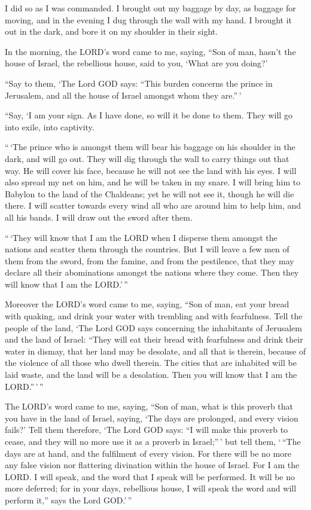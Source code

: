  I did so as I was commanded. I brought out my baggage by
day, as baggage for moving, and in the evening I dug through the wall
with my hand. I brought it out in the dark, and bore it on my shoulder
in their sight.

 In the morning, the LORD's word came to me, saying,
 ``Son of man, hasn't the house of Israel, the rebellious
house, said to you, `What are you doing?'

 ``Say to them, `The Lord GOD says: ``This burden concerns
the prince in Jerusalem, and all the house of Israel amongst whom they
are.''\,'

 ``Say, `I am your sign. As I have done, so will it be done
to them. They will go into exile, into captivity.

 ``\,`The prince who is amongst them will bear his baggage
on his shoulder in the dark, and will go out. They will dig through the
wall to carry things out that way. He will cover his face, because he
will not see the land with his eyes.  I will also spread my
net on him, and he will be taken in my snare. I will bring him to
Babylon to the land of the Chaldeans; yet he will not see it, though he
will die there.  I will scatter towards every wind all who
are around him to help him, and all his bands. I will draw out the sword
after them.

 ``\,`They will know that I am the LORD when I disperse
them amongst the nations and scatter them through the countries.
 But I will leave a few men of them from the sword, from
the famine, and from the pestilence, that they may declare all their
abominations amongst the nations where they come. Then they will know
that I am the LORD.'\,''

 Moreover the LORD's word came to me, saying, 
``Son of man, eat your bread with quaking, and drink your water with
trembling and with fearfulness.  Tell the people of the
land, `The Lord GOD says concerning the inhabitants of Jerusalem and the
land of Israel: ``They will eat their bread with fearfulness and drink
their water in dismay, that her land may be desolate, and all that is
therein, because of the violence of all those who dwell therein.
 The cities that are inhabited will be laid waste, and the
land will be a desolation. Then you will know that I am the
LORD.''\,'\,''

 The LORD's word came to me, saying,  ``Son of
man, what is this proverb that you have in the land of Israel, saying,
`The days are prolonged, and every vision fails?'  Tell
them therefore, `The Lord GOD says: ``I will make this proverb to cease,
and they will no more use it as a proverb in Israel;''\,' but tell them,
`\,``The days are at hand, and the fulfilment of every vision.
 For there will be no more any false vision nor flattering
divination within the house of Israel.  For I am the LORD.
I will speak, and the word that I speak will be performed. It will be no
more deferred; for in your days, rebellious house, I will speak the word
and will perform it,'' says the Lord GOD.'\,''

